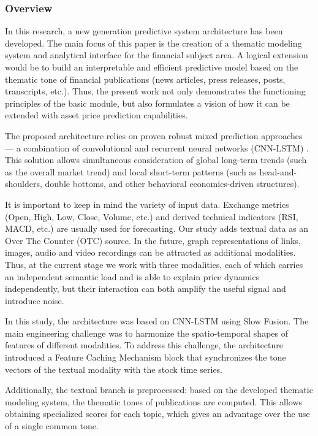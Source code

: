 \subsubsection{Overview}

In this research, a new generation predictive system architecture has been developed. The main focus
of this paper is the creation of a thematic modeling system and analytical interface for the financial
subject area. A logical extension would be to build an interpretable and efficient predictive model based
on the thematic tone of financial publications (news articles, press releases, posts, transcripts, etc.).
Thus, the present work not only demonstrates the functioning principles of the basic module, but also
formulates a vision of how it can be extended with asset price prediction capabilities.

The proposed architecture relies on proven robust mixed prediction approaches --- a combination of convolutional
and recurrent neural networks (CNN-LSTM) \parencite{Hochreiter1997LSTM, CNN1998lecun, CNN_LSTM2020finance}. This solution
allows simultaneous consideration of global long-term trends (such as the overall market trend) and local short-term
patterns (such as head-and-shoulders, double bottoms, and other behavioral economics-driven structures).

It is important to keep in mind the variety of input data. Exchange metrics (Open, High, Low, Close, Volume, etc.)
and derived technical indicators (RSI, MACD, etc.) are usually used for forecasting. Our study adds textual data
as an Over The Counter (OTC) source. In the future, graph representations of links, images, audio and video
recordings can be attracted as additional modalities. Thus, at the current stage we work with three modalities,
each of which carries an independent semantic load and is able to explain price dynamics independently,
but their interaction can both amplify the useful signal and introduce noise.

In this study, the architecture was based on CNN-LSTM using Slow Fusion. The main engineering challenge was to harmonize
the spatio-temporal shapes of features of different modalities. To address this challenge, the architecture introduced
a Feature Caching Mechanism block that synchronizes the tone vectors of the textual modality with the stock time series.

Additionally, the textual branch is preprocessed: based on the developed thematic modeling system, the thematic tones
of publications are computed. This allows obtaining specialized scores for each topic, which gives an advantage over
the use of a single common tone.

